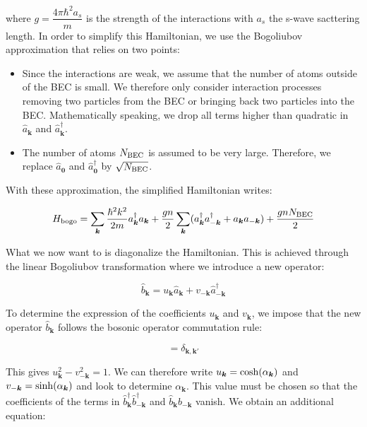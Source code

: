 \noindent where $g=\dfrac{4 \pi \hbar^2 a_s}{m}$ is the strength of the interactions with $a_s$ the s-wave sacttering length.  In order to simplify this Hamiltonian, we use the Bogoliubov approximation that relies on two points:

\begin{itemize}
    \item Since the interactions are weak, we assume that the number of atoms outside of the BEC is small. We therefore only consider interaction processes removing two particles from the BEC or bringing back two particles into the BEC. Mathematically speaking, we drop all terms higher than quadratic in $\hat{a}_{\bm{k}}$ and $\hat{a}^{\dagger}_{\bm{k}}$.
    \item The number of atoms $N_{\rm{BEC}}$ is assumed to be very large. Therefore, we replace $\hat{a}_{\bm{0}}$ and $\hat{a}^{\dagger}_{\bm{0}}$ by $\sqrt{N_{\rm{BEC}}}$. 
\end{itemize}

With these approximation, the simplified Hamiltonian writes:

\begin{equation}
    H_{\rm{bogo}}=\sum_{\bm{k}}\frac{\hbar^2 k^2}{2m} a^{\dagger}_{\bm{k}}  a_{\bm{k}} +  \frac{gn}{2} \sum_{\bm{k}} (a^{\dagger}_{\bm{k}} a^{\dagger}_{-\bm{k}} +a_{\bm{k}} a_{-\bm{k}})+\frac{gnN_{\rm{BEC}}}{2}
\end{equation}

What we now want to is diagonalize the Hamiltonian. This is achieved through the linear Bogoliubov transformation where we introduce a new operator:

\begin{equation}
    \hat{b}_{\bm{k}}=u_{\bm{k}} \hat{a}_{\bm{k}} + v_{-\bm{k}} \hat{a}^{\dagger}_{-\bm{k}}
\end{equation}

To determine the expression of the coefficients $u_{\bm{k}}$ and $v_{\bm{k}}$, we impose that the new operator $\hat{b}_{\bm{k}}$ follows the bosonic operator commutation rule:

\begin{equation}
    [\hat{b}_{\bm{k}},\hat{b}^{\dagger}_{\bm{k}'}]= \delta_{\bm{k},\bm{k}'}
\end{equation}

This gives $u_{\bm{k}}^2 -  v_{-\bm{k}}^2 =1$. We can therefore write $u_{\bm{k}}={\rm cosh}(\alpha_{\bm{k}})$ and $v_{-\bm{k}}={\rm sinh}(\alpha_{\bm{k}})$ and look to determine $\alpha_{\bm{k}}$. This value must be chosen so that the coefficients of the terms in $\hat{b}^{\dagger}_{\bm{k}} \hat{b}^{\dagger}_{-\bm{k}}$ and $\hat{b}_{\bm{k}} \hat{b}_{-\bm{k}}$ vanish. We obtain an additional equation:

